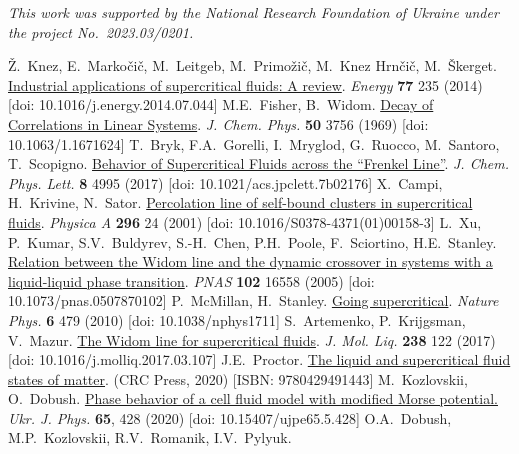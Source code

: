 \vskip3mm \textit{This work was supported by the National Research Foundation of Ukraine under the project No.~2023.03/0201.}

\begin{thebibliography}{99}
	
	 {\v{Z}}.~Knez, E.~Marko{\v{c}}i{\v{c}}, M.~Leitgeb, M.~Primo{\v{z}}i{\v{c}}, M.~Knez Hrn{\v{c}}i{\v{c}}, M.~{\v{S}}kerget.
	\href{https://doi.org/10.1016/j.energy.2014.07.044}{Industrial applications of supercritical fluids: A review}. \textit{Energy} \textbf{77} 235 (2014) [doi: 10.1016/j.energy.2014.07.044]
	 M.E.~Fisher, B.~Widom.
	\href{https://doi.org/10.1063/1.1671624}{Decay of Correlations in Linear Systems}. \textit{J. Chem. Phys.} \textbf{50} 3756 (1969) [doi: 10.1063/1.1671624]
	 T.~Bryk, F.A.~Gorelli, I.~Mryglod, G.~Ruocco, M.~Santoro, T.~Scopigno.
	\href{https://doi.org/10.1021/acs.jpclett.7b02176}{Behavior of Supercritical Fluids across the “Frenkel Line”}. \textit{J. Chem. Phys. Lett.} \textbf{8} 4995 (2017) [doi: 10.1021/acs.jpclett.7b02176]
	 X.~Campi, H.~Krivine, N.~Sator.
	\href{https://doi.org/10.1016/S0378-4371(01)00158-3}{Percolation line of self-bound clusters in supercritical fluids}. \textit{Physica A} \textbf{296} 24 (2001) [doi: 10.1016/S0378-4371(01)00158-3] 
	 L.~Xu, P.~Kumar, S.V.~Buldyrev, S.-H.~Chen, P.H.~Poole, F.~Sciortino, H.E.~Stanley.
	\href{https://doi.org/10.1073/pnas.0507870102}{Relation between the Widom line and the dynamic crossover in systems with a liquid-liquid phase transition}. \textit{PNAS} \textbf{102} 16558 (2005) [doi: 10.1073/pnas.0507870102]
	 P.~McMillan, H.~Stanley.
	\href{https://doi.org/10.1038/nphys1711}{Going supercritical}. \textit{Nature Phys.} \textbf{6} 479 (2010) [doi: 10.1038/nphys1711]
	 S.~Artemenko, P.~Krijgsman, V.~Mazur. 
	\href{https://doi.org/10.1016/j.molliq.2017.03.107}{The Widom line for supercritical fluids}. \textit{J. Mol. Liq.} \textbf{238} 122 (2017) [doi: 10.1016/j.molliq.2017.03.107]
	 J.E.~Proctor.
	\href{https://doi.org/10.1201/9780429491443}{The liquid and supercritical fluid states of matter}. (CRC Press, 2020)  [ISBN: 9780429491443]
	 M.~Kozlovskii, O.~Dobush.
	\href{https://ujp.bitp.kiev.ua/index.php/ujp/article/view/2019631}{Phase behavior of a cell fluid model with modified Morse potential.} \textit{Ukr. J. Phys.} \textbf{65}, 428 (2020) [doi: 10.15407/ujpe65.5.428]
	 O.A.~Dobush, M.P.~Kozlovskii, R.V.~Romanik, I.V.~Pylyuk.

\end{thebibliography}
